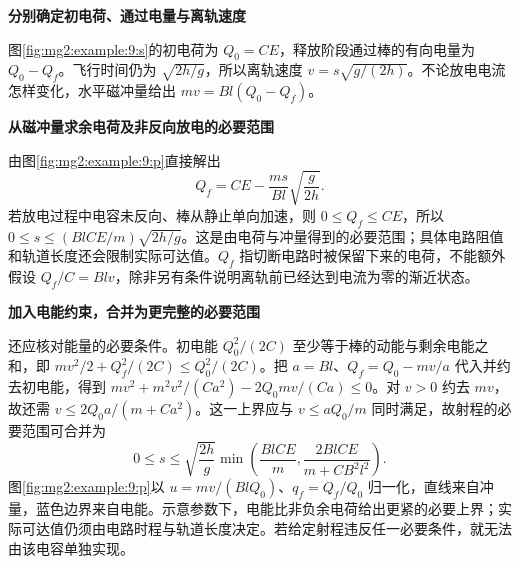 \begin{solution}\textbf{分别确定初电荷、通过电量与离轨速度}\par\nobreak
图\ref{fig:mg2:example:9:s}的初电荷为 $Q_0=CE$，释放阶段通过棒的有向电量为 $Q_0-Q_f$。飞行时间仍为 $\sqrt{2h/g}$，所以离轨速度 $v=s\sqrt{g/(2h)}$。不论放电电流怎样变化，水平磁冲量给出 $mv=Bl(Q_0-Q_f)$。



\par\medskip{}\noindent\textbf{从磁冲量求余电荷及非反向放电的必要范围}\par\nobreak
由图\ref{fig:mg2:example:9:p}直接解出
\[
Q_f=CE-\frac{ms}{Bl}\sqrt{\frac g{2h}}.
\]
若放电过程中电容未反向、棒从静止单向加速，则 $0\le Q_f\le CE$，所以 $0\le s\le(BlCE/m)\sqrt{2h/g}$。这是由电荷与冲量得到的必要范围；具体电路阻值和轨道长度还会限制实际可达值。$Q_f$ 指切断电路时被保留下来的电荷，不能额外假设 $Q_f/C=Blv$，除非另有条件说明离轨前已经达到电流为零的渐近状态。



\par\medskip{}\noindent\textbf{加入电能约束，合并为更完整的必要范围}\par\nobreak
还应核对能量的必要条件。初电能 $Q_0^2/(2C)$ 至少等于棒的动能与剩余电能之和，即 $mv^2/2+Q_f^2/(2C)\le Q_0^2/(2C)$。把 $a=Bl$、$Q_f=Q_0-mv/a$ 代入并约去初电能，得到 $mv^2+m^2v^2/(Ca^2)-2Q_0mv/(Ca)\le0$。对 $v>0$ 约去 $mv$，故还需 $v\le2Q_0a/(m+Ca^2)$。这一上界应与 $v\le aQ_0/m$ 同时满足，故射程的必要范围可合并为\[\boxed{0\le s\le\sqrt{\frac{2h}{g}}\min\!\left(\frac{BlCE}{m},\frac{2BlCE}{m+CB^2l^2}\right)}.\]图\ref{fig:mg2:example:9:p}以 $u=mv/(BlQ_0)$、$q_f=Q_f/Q_0$ 归一化，直线来自冲量，蓝色边界来自电能。示意参数下，电能比非负余电荷给出更紧的必要上界；实际可达值仍须由电路时程与轨道长度决定。若给定射程违反任一必要条件，就无法由该电容单独实现。\end{solution}
